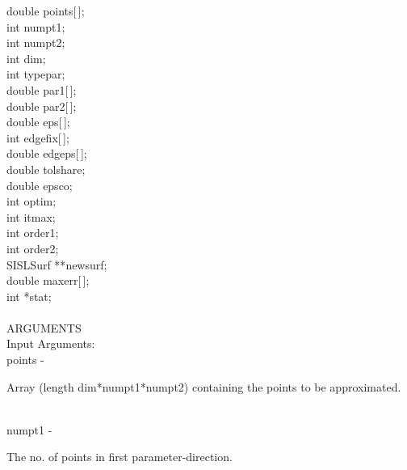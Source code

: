                 \>\>    double  \>      {\fov points}[\,];\\
                \>\>    int     \>      {\fov numpt1};\\
                \>\>    int     \>      {\fov numpt2};\\
                \>\>    int     \>      {\fov dim};\\
                \>\>    int     \>      {\fov typepar};\\
                \>\>    double  \>      {\fov par1}[\,];\\
                \>\>    double  \>      {\fov par2}[\,];\\
                \>\>    double  \>      {\fov eps}[\,];\\
                \>\>    int     \>      {\fov edgefix}[\,];\\
                \>\>    double  \>      {\fov edgeps}[\,];\\
                \>\>    double  \>      {\fov tolshare};\\
                \>\>    double  \>      {\fov epsco};\\
                \>\>    int     \>      {\fov optim};\\
                \>\>    int     \>      {\fov itmax};\\
                \>\>    int     \>      {\fov order1};\\
                \>\>    int     \>      {\fov order2};\\
                \>\>    SISLSurf        \>      **{\fov newsurf};\\
                \>\>    double  \>      {\fov maxerr}[\,];\\
                \>\>    int     \>      *{\fov stat};\\
\\
ARGUMENTS\\
        \>Input Arguments:\\
        \>\>    {\fov points}\> - \>    \begin{minipg2}
                                Array (length dim*numpt1*numpt2) containing the points
                                to be approximated.
                                \end{minipg2}\\[0.3ex]
        \>\>    {\fov numpt1}\> - \>    \begin{minipg2}
                                The no. of points in first parameter-direction.
                                \end{minipg2}\\
